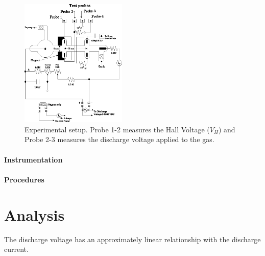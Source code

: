 \documentclass{sigchi}
\begin{document}
\begin{figure}[h]
\includegraphics[width=0.45\textwidth]{plots/apparatus.png}
\caption{Experimental setup. Probe 1-2 measures the Hall Voltage ($V_H$) and Probe 2-3 measures the discharge voltage applied to the gas.}
\label{setup}
\end{figure}
\paragraph{Instrumentation} 
\paragraph{Procedures}

\section{Analysis}\label{sec:analysis}
The discharge voltage has an approximately linear relationship with the discharge current.
\end{document}
